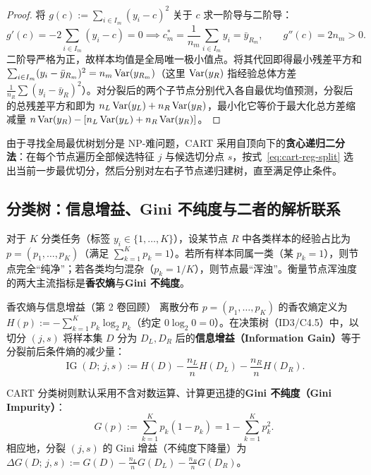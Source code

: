 \begin{proof}
将 $g(c) := \sum_{i \in I_m}(y_i - c)^2$ 关于 $c$ 求一阶导与二阶导：
\[
  g'(c) = -2\sum_{i \in I_m}(y_i - c) = 0 \implies c_m^* = \frac{1}{n_m}\sum_{i \in I_m} y_i = \bar{y}_{R_m}, \qquad
  g''(c) = 2 n_m > 0.
\]
二阶导严格为正，故样本均值是全局唯一极小值点。将其代回即得最小残差平方和 $\sum_{i \in I_m}(y_i - \bar{y}_{R_m})^2 = n_m \operatorname{Var}(y_{R_m})$（这里 $\operatorname{Var}(y_R)$ 指经验总体方差 $\frac{1}{n_R}\sum (y_i - \bar{y}_R)^2$）。对分裂后的两个子节点分别代入各自最优均值预测，分裂后的总残差平方和即为 $n_L \operatorname{Var}(y_L) + n_R \operatorname{Var}(y_R)$，最小化它等价于最大化总方差缩减量 $n\operatorname{Var}(y_R) - [n_L \operatorname{Var}(y_L) + n_R \operatorname{Var}(y_R)]$。
\end{proof}

由于寻找全局最优树划分是 NP-难问题，CART 采用自顶向下的\textbf{贪心递归二分法}：在每个节点遍历全部候选特征 $j$ 与候选切分点 $s$，按式~\eqref{eq:cart-reg-split} 选出当前一步最优切分，然后分别对左右子节点递归建树，直至满足停止条件。

\subsection{分类树：信息增益、Gini 不纯度与二者的解析联系}

对于 $K$ 分类任务（标签 $y_i \in \{1, \dots, K\}$），设某节点 $R$ 中各类样本的经验占比为 $p = (p_1, \dots, p_K)$（满足 $\sum_{k=1}^K p_k = 1$）。若所有样本同属一类（某 $p_k = 1$），则节点完全“纯净”；若各类均匀混杂（$p_k = 1/K$），则节点最“浑浊”。衡量节点浑浊度的两大主流指标是\textbf{香农熵}与\textbf{Gini 不纯度}。

\begin{recallBox}{香农熵与信息增益（第 2 卷回顾）}
离散分布 $p = (p_1, \dots, p_K)$ 的香农熵定义为 $H(p) := -\sum_{k=1}^K p_k \log_2 p_k$（约定 $0\log_2 0 = 0$）。在决策树（ID3/C4.5）中，以切分 $(j, s)$ 将样本集 $D$ 分为 $D_L, D_R$ 后的\textbf{信息增益（Information Gain）}等于分裂前后条件熵的减少量：
\[
  \operatorname{IG}(D;\, j, s) := H(D) - \frac{n_L}{n} H(D_L) - \frac{n_R}{n} H(D_R).
\]
\end{recallBox}

CART 分类树则默认采用不含对数运算、计算更迅捷的\textbf{Gini 不纯度（Gini Impurity）}：
\begin{equation}\label{eq:gini-def}
  G(p) := \sum_{k=1}^{K} p_k (1 - p_k) = 1 - \sum_{k=1}^{K} p_k^2.
\end{equation}
相应地，分裂 $(j, s)$ 的 Gini 增益（不纯度下降量）为 $\Delta G(D;\, j, s) := G(D) - \frac{n_L}{n} G(D_L) - \frac{n_R}{n} G(D_R)$。

